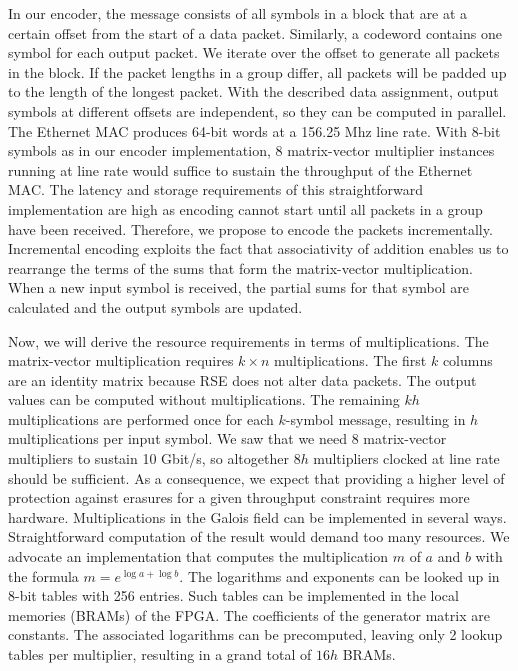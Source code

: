 In our encoder, the message consists of all symbols in a block that are at a
certain offset from the start of a data packet.  Similarly, a codeword contains
one symbol for each output packet.  We iterate over the offset to generate
all packets in the block.  If the packet lengths in a group differ, all packets
will be padded up to the length of the longest packet.
With the described data assignment, output symbols at
different offsets are independent, so they can be computed in parallel.  The
Ethernet MAC produces 64-bit words at a 156.25 Mhz line rate.  With 8-bit symbols as in our
encoder implementation, 8 matrix-vector multiplier instances running at
line rate would suffice to sustain the throughput of the Ethernet MAC.  The
latency and storage requirements of this straightforward implementation are
high as encoding cannot start until all packets in a group have been received.
Therefore, we propose to encode the packets incrementally.  Incremental
encoding exploits the fact that associativity of addition enables us to
rearrange the terms of the sums that form the matrix-vector multiplication.
When a new input symbol is received, the partial sums for that symbol are
calculated and the output symbols are updated.

Now, we will derive the resource requirements in terms of multiplications.
The matrix-vector multiplication requires $k \times n$ multiplications.  The
first $k$ columns are an identity matrix because RSE does not alter data
packets.  The output values can be computed without multiplications.  The
remaining $kh$ multiplications are performed once for each $k$-symbol message,
resulting in $h$ multiplications per input symbol.  We saw that we need 8
matrix-vector multipliers to sustain 10 Gbit/s, so altogether $8h$ multipliers
clocked at line rate should be sufficient.  As a consequence, we expect that
providing a higher level of protection against erasures for a given throughput
constraint requires more hardware.  Multiplications in the Galois field can be
implemented in several ways.  Straightforward computation of the result would
demand too many resources.  We advocate an implementation that computes the
multiplication $m$ of $a$ and $b$ with the formula $m = e^{\log a + \log b}$.
The logarithms and exponents can be looked up in 8-bit tables with 256 entries.
Such tables can be implemented in the local memories (BRAMs) of the FPGA.  
The coefficients of the generator matrix are constants.  The associated
logarithms can be precomputed, leaving only 2 lookup tables per multiplier,
resulting in a grand total of $16h$ BRAMs.

